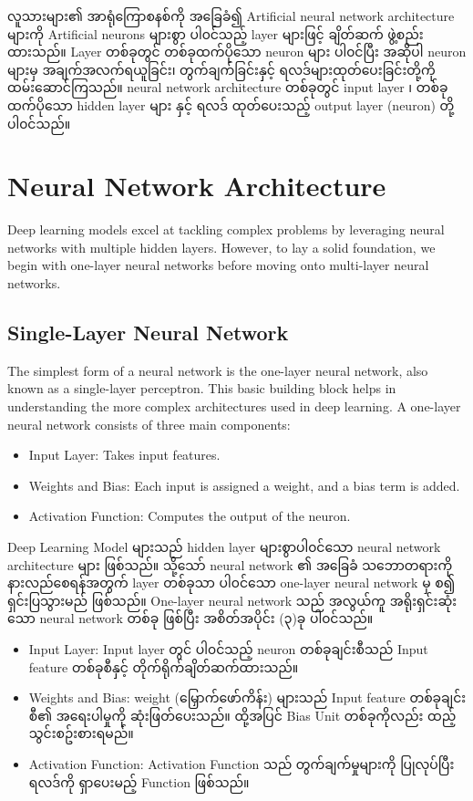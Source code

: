 လူသားများ၏ အာရုံကြောစနစ်ကို အခြေခံ၍ Artificial neural network architecture များကို Artificial neurons များစွာ ပါ၀င်သည့် layer များဖြင့် ချိတ်ဆက် ဖွဲ့စည်းထားသည်။ Layer တစ်ခုတွင် တစ်ခုထက်ပိုသော neuron များ ပါ၀င်ပြီး အဆိုပါ neuron များမှ အချက်အလက်ရယူခြင်း၊ တွက်ချက်ခြင်းနှင့် ရလဒ်များထုတ်ပေးခြင်းတို့ကို ထမ်းဆောင်ကြသည်။ neural network architecture တစ်ခုတွင် input layer ၊  တစ်ခုထက်ပိုသော hidden layer များ နှင့် ရလဒ် ထုတ်ပေးသည့် output layer (neuron) တို့ ပါ၀င်သည်။ 

\section{Neural Network Architecture} \label{sec:architecture}

Deep learning models excel at tackling complex problems by leveraging neural networks with multiple hidden layers. However, to lay a solid foundation, we begin with one-layer neural networks before moving onto multi-layer neural networks. 

\subsection{Single-Layer Neural Network}\label{sec:SLP}
The simplest form of a neural network is the one-layer neural network, also known as a single-layer perceptron. This basic building block helps in understanding the more complex architectures used in deep learning. A one-layer neural network consists of three main components:

\begin{itemize}
  \item Input Layer: Takes input features.
  \item Weights and Bias: Each input is assigned a weight, and a bias term is added.
  \item Activation Function: Computes the output of the neuron.
\end{itemize}

Deep Learning Model များသည် hidden layer များစွာပါ၀င်သော neural network architecture များ ဖြစ်သည်။ သို့သော် neural network ၏ အခြေခံ သဘောတရားကို နားလည်စေရန်အတွက် layer တစ်ခုသာ ပါ၀င်သော  one-layer neural network  မှ စ၍ ရှင်းပြသွားမည် ဖြစ်သည်။ One-layer neural network သည် အလွယ်ကူ အရိုးရှင်းဆုံးသော neural network တစ်ခု ဖြစ်ပြီး အစိတ်အပိုင်း (၃)ခု ပါ၀င်သည်။ 

\begin{itemize}
  \item Input Layer: Input layer တွင် ပါ၀င်သည့်  neuron တစ်ခုချင်းစီသည် Input feature တစ်ခုစီနှင့် တိုက်ရိုက်ချိတ်ဆက်ထားသည်။ 
  \item Weights and Bias: weight (မြှောက်ဖော်ကိန်း) များသည် Input feature တစ်ခုချင်းစီ၏ အရေးပါမှုကို ဆုံးဖြတ်ပေးသည်။ ထို့အပြင် Bias Unit တစ်ခုကိုလည်း ထည့်သွင်းစဥ်းစားရမည်။ 
  \item Activation Function: Activation Function သည် တွက်ချက်မှုများကို ပြုလုပ်ပြီး ရလဒ်ကို ရှာပေးမည့် Function ဖြစ်သည်။ 
\end{itemize}

